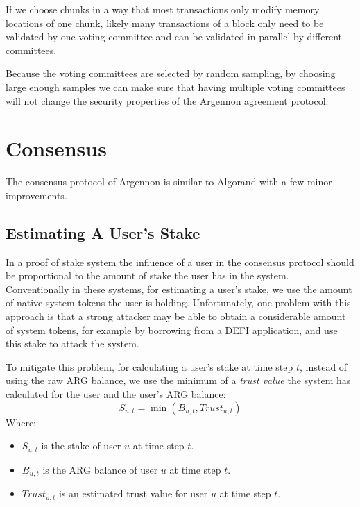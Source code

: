 \documentclass[a4paper]{report}
\begin{document}
    If we choose chunks in a way that most transactions only modify memory locations of one chunk,
    likely many transactions of a block only need to be validated by one voting committee and can be validated in
    parallel by different committees.

    Because the voting committees are selected by random sampling, by choosing large enough samples we can make sure
    that having multiple voting committees will not change the security properties of the Argennon agreement protocol.


    \section{Consensus}\label{sec:consensus}

    The consensus protocol of Argennon is similar to Algorand with a few minor improvements.

    \subsection{Estimating A User's Stake}\label{subsec:estimating-a-user's-stake}

    In a proof of stake system the influence of a user in the consensus protocol should be proportional to the amount
    of stake the user has in the system. Conventionally in these systems, for estimating a user's stake, we use the
    amount of native system tokens the user is holding. Unfortunately, one problem with this approach is that a
    strong attacker may be able to obtain a considerable amount of system tokens, for example by borrowing from a
    DEFI application, and use this stake to attack the system.

    To mitigate this problem, for calculating a user's stake at time step \(t\), instead of using the raw ARG
    balance, we use the minimum of a \emph{trust value} the system has calculated for the user and the user's
    ARG balance:
    \[
        S_{u,t} = \min (B_{u,t}, Trust_{u,t})
    \]
    Where:
    \begin{itemize}
        \item \(S_{u,t}\) is the stake of user \(u\) at time step \(t\).
        \item \(B_{u,t}\) is the ARG balance of user \(u\) at time step \(t\).
        \item \(Trust_{u,t}\) is an estimated trust value for user \(u\) at time step \(t\).
    \end{itemize}
\end{document}
